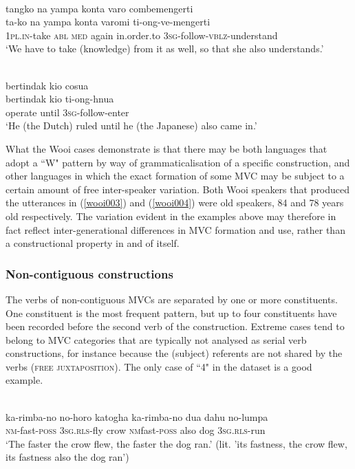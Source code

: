 \ea \label{wooi003}
\\
\glll tangko na yampa konta varo combemengerti \\
ta-ko na yampa konta varomi ti-ong-ve-mengerti \\
1\textsc{pl}.\textsc{in}-take \textsc{abl} \textsc{med} again in.order.to 3\textsc{sg}-follow-\textsc{vblz}-understand \\
\glft `We have to take (knowledge) from it as well, so that she also understands.'\\ 
\z

\ea \label{wooi004}
\\
\glll bertindak kio cosua \\
bertindak kio ti-ong-hnua \\
operate until 3\textsc{sg}-follow-enter \\
\glft `He (the Dutch) ruled until he (the Japanese) also came in.'\\ 
\z

What the Wooi cases demonstrate is that there may be both languages that adopt a ``W" pattern by way of grammaticalisation of a specific construction, and other languages in which the exact formation of some MVC may be subject to a certain amount of free inter-speaker variation. Both Wooi speakers that produced the utterances in (\ref{wooi003}) and (\ref{wooi004}) were old speakers, 84 and 78 years old respectively. The variation evident in the examples above may therefore in fact reflect inter-generational differences in MVC formation and use, rather than a constructional property in and of itself.

\subsubsection{Non-contiguous constructions}

The verbs of non-contiguous MVCs are separated by one or more constituents. One constituent is the most frequent pattern, but up to four constituents have been recorded before the second verb of the construction. Extreme cases tend to belong to MVC categories that are typically not analysed as serial verb constructions, for instance because the (subject) referents are not shared by the verbs (\textsc{free juxtaposition}). The only case of ``4" in the dataset is a good example.

\ea \label{Muna047}
\\
\gll ka-rimba-no no-horo katogha ka-rimba-no dua dahu no-lumpa \\
\textsc{nm}-fast-\textsc{poss} 3\textsc{sg}.\textsc{rls}-fly crow \textsc{nm}fast-\textsc{poss} also dog 3\textsc{sg}.\textsc{rls}-run \\
\glft `The faster the crow flew, the faster the dog ran.' (lit. 'its fastness, the crow flew, its fastness also the dog ran')\\ 
\z

